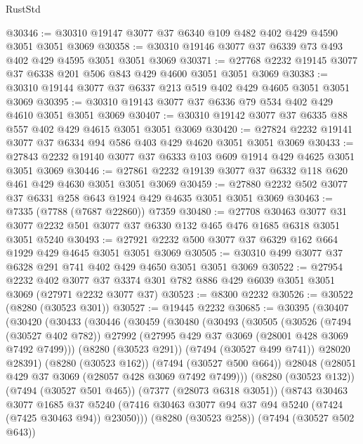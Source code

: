 \begin{lexlean}{RustStd}
\begin{coremodule}
@30346 := @30310 @19147 @3077 @37 @6340 @109 @482 @402 @429 @4590 @3051 @3051 @3069
@30358 := @30310 @19146 @3077 @37 @6339 @73 @493 @402 @429 @4595 @3051 @3051 @3069
@30371 := @27768 @2232 @19145 @3077 @37 @6338 @201 @506 @843 @429 @4600 @3051 @3051 @3069
@30383 := @30310 @19144 @3077 @37 @6337 @213 @519 @402 @429 @4605 @3051 @3051 @3069
@30395 := @30310 @19143 @3077 @37 @6336 @79 @534 @402 @429 @4610 @3051 @3051 @3069
@30407 := @30310 @19142 @3077 @37 @6335 @88 @557 @402 @429 @4615 @3051 @3051 @3069
@30420 := @27824 @2232 @19141 @3077 @37 @6334 @94 @586 @403 @429 @4620 @3051 @3051 @3069
@30433 := @27843 @2232 @19140 @3077 @37 @6333 @103 @609 @1914 @429 @4625 @3051 @3051 @3069
@30446 := @27861 @2232 @19139 @3077 @37 @6332 @118 @620 @461 @429 @4630 @3051 @3051 @3069
@30459 := @27880 @2232 @502 @3077 @37 @6331 @258 @643 @1924 @429 @4635 @3051 @3051 @3069
@30463 := @7335 (@7788 (@7687 @22860)) @7359
@30480 := @27708
    @30463
    @3077
    @31
    @3077
    @2232
    @501
    @3077
    @37
    @6330
    @132
    @465
    @476
    @1685
    @6318
    @3051
    @3051
    @5240
@30493 := @27921 @2232 @500 @3077 @37 @6329 @162 @664 @1929 @429 @4645 @3051 @3051 @3069
@30505 := @30310 @499 @3077 @37 @6328 @291 @741 @402 @429 @4650 @3051 @3051 @3069
@30522 := @27954
    @2232
    @402
    @3077
    @37
    @3374
    @301
    @782
    @886
    @429
    @6039
    @3051
    @3051
    @3069
    (@27971 @2232 @3077 @37)
@30523 := @8300 @2232
@30526 := @30522 (@8280 (@30523 @301))
@30527 := @19445 @2232
@30685 := @30395
    (@30407
      (@30420
        (@30433
          (@30446
            (@30459
              (@30480
                (@30493
                  (@30505
                    (@30526
                      (@7494 (@30527 @402 @782))
                      @27992
                      (@27995 @429 @37 @3069 (@28001 @428 @3069 @7492 @7499)))
                    (@8280 (@30523 @291))
                    (@7494 (@30527 @499 @741))
                    @28020
                    @28391)
                  (@8280 (@30523 @162))
                  (@7494 (@30527 @500 @664))
                  @28048
                  (@28051 @429 @37 @3069 (@28057 @428 @3069 @7492 @7499)))
                (@8280 (@30523 @132))
                (@7494 (@30527 @501 @465))
                (@7377 (@28073 @6318 @3051))
                (@8743
                  @30463
                  @3077
                  @1685
                  @37
                  @5240
                  (@7416 @30463 @3077 @94 @37 @94 @5240 (@7424 (@7425 @30463 @94)) @23050)))
              (@8280 (@30523 @258))
              (@7494 (@30527 @502 @643))

\end{coremodule}
\end{lexlean}
